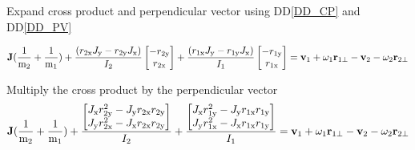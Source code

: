 \documentclass[12pt]{article}
\begin{document}
\noindent
Expand cross product and perpendicular vector using DD\ref{DD_CP} and
DD\ref{DD_PV}

\begin{equation*}
\textbf J(\frac{1}{ \textnormal m_\text{2}} + \frac{1}{ \textnormal
m_\text{1}})+ \frac{(r_\text{2x}J_\text{y} - r_\text{2y}J_\text{x})}{I_\text{2}}
 \begin{bmatrix}
         -r_\text{2y} \\
        r_\text{2x} \\
\end{bmatrix} + \frac{(r_\text{1x}J_\text{y} -
r_\text{1y}J_\text{x})}{I_\text{1}}
 \begin{bmatrix}
         -r_\text{1y} \\
        r_\text{1x} \\
        \end{bmatrix} 
= \textbf v_\text{1} + \omega_\text{1} \textbf r_\text{1$\perp$} - \textbf
v_\text{2} - \omega_\text{2}\textbf r_\text{2$\perp$}
\end{equation*}

\noindent
Multiply the cross product by the perpendicular vector
\begin{equation*}
\textbf J(\frac{1}{ \textnormal m_\text{2}} + \frac{1}{ \textnormal
m_\text{1}})+ \frac{
 \begin{bmatrix}
         J_\text{x}r_\text{2y}^{2} -J_\text{y}r_\text{2x}r_\text{2y}\\
        J_\text{y}r_\text{2x}^{2} -J_\text{x}r_\text{2x}r_\text{2y} \\
        \end{bmatrix}}{I_\text{2}} + \frac{
 \begin{bmatrix}
         J_\text{x}r_\text{1y}^{2} -J_\text{y}r_\text{1x}r_\text{1y}\\
        J_\text{y}r_\text{1x}^{2} -J_\text{x}r_\text{1x}r_\text{1y} \\
        \end{bmatrix}}{I_\text{1}} 
= \textbf v_\text{1} + \omega_\text{1} \textbf r_\text{1$\perp$} - \textbf
v_\text{2} - \omega_\text{2}\textbf r_\text{2$\perp$}
\end{equation*}
\end{document}
